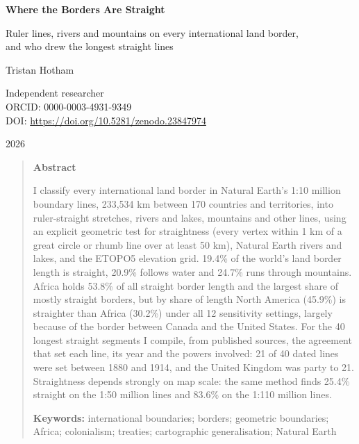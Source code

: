 \documentclass[11pt,a4paper]{article}
\begin{document}
\begin{center}
{\Large\bfseries Where the Borders Are Straight\par}
\vspace{0.4em}
{\large Ruler lines, rivers and mountains on every international land border,\\and who drew the longest straight lines\par}
\vspace{1.2em}
{\large Tristan Hotham\par}
\vspace{0.3em}
{\small Independent researcher\\
ORCID: 0000-0003-4931-9349\\
DOI: \href{https://doi.org/10.5281/zenodo.23847974}{https://doi.org/10.5281/zenodo.23847974}\par}
\vspace{0.8em}
2026
\end{center}

\begin{quote}
\small
\begin{center}\textbf{Abstract}\end{center}
I classify every international land border in Natural Earth's 1:10 million boundary lines, 233,534 km between 170 countries and territories, into ruler-straight stretches, rivers and lakes, mountains and other lines, using an explicit geometric test for straightness (every vertex within 1 km of a great circle or rhumb line over at least 50 km), Natural Earth rivers and lakes, and the ETOPO5 elevation grid. 19.4\% of the world's land border length is straight, 20.9\% follows water and 24.7\% runs through mountains. Africa holds 53.8\% of all straight border length and the largest share of mostly straight borders, but by share of length North America (45.9\%) is straighter than Africa (30.2\%) under all 12 sensitivity settings, largely because of the border between Canada and the United States. For the 40 longest straight segments I compile, from published sources, the agreement that set each line, its year and the powers involved: 21 of 40 dated lines were set between 1880 and 1914, and the United Kingdom was party to 21. Straightness depends strongly on map scale: the same method finds 25.4\% straight on the 1:50 million lines and 83.6\% on the 1:110 million lines.

\textbf{Keywords:} international boundaries; borders; geometric boundaries; Africa; colonialism; treaties; cartographic generalisation; Natural Earth
\end{quote}
\end{document}

